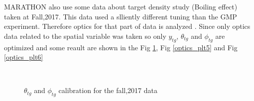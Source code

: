 MARATHON also use some data about target density study (Boiling effect) taken at Fall,2017. This data used a slliently different tuning than the GMP experiment. Therefore optics for that part of data is analyzed . Since only optics data related to the spatial variable was taken so only $y_{tg}$, $\theta_{tg}$ and $\phi_{tg}$ are optimized and some reault are shown in the Fig \ref{optics_plt4}, Fig \ref{optics_plt5} and Fig \ref{optics_plt6}


\begin{figure}[htbp]
\\
 \centering
\caption{$\theta_{tg} $ and $\phi_{tg}$ calibration for the fall,2017 data}
\label{optics_plt4}
\end{figure}

